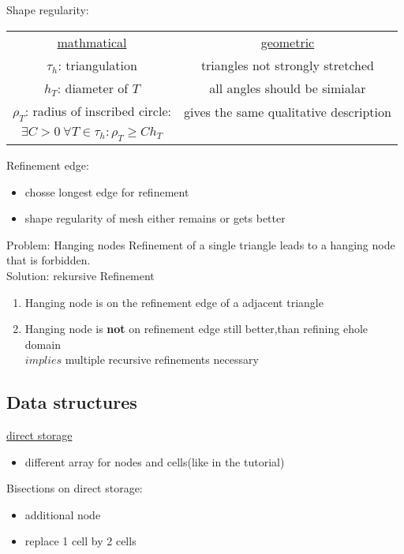 Shape regularity:\\
\begin{tabular}{c | c}
	\underline{mathmatical} & \underline{geometric}\\
	$\tau_h$:  triangulation & triangles not strongly stretched \\
	$h_T$:  diameter of $T$ & all angles should be \glqq simialar \grqq \\
	$\rho_T$:  radius of inscribed circle:	& gives the same qualitative description\\
	$\exists C > 0\ \forall T \in \tau_h \colon \rho_T \geq C h_T$ & 
\end{tabular}


Refinement edge:
\begin{itemize}
	\item chosse longest edge for refinement
	\item shape regularity of mesh either remains or gets better
\end{itemize}

Problem: Hanging nodes
Refinement of a single triangle leads to a hanging node that is forbidden.\\
Solution: rekursive Refinement\\
\begin{enumerate}[label= case \arabic*:]
	\item Hanging node is on the refinement edge of a adjacent triangle
	\item Hanging node is \textbf{not} on refinement edge
	still better,than refining ehole domain\\
	$implies$ multiple recursive refinements necessary
\end{enumerate}

\subsection{Data structures}
\underline{direct storage}\\
\begin{itemize}
	\item different array for nodes and cells(like in the tutorial)
\end{itemize}
Bisections on direct storage:
\begin{itemize}
	\item additional node
	\item replace 1 cell by 2 cells
\end{itemize}

